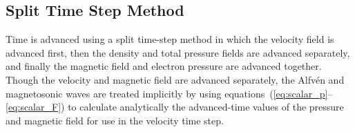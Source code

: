 \documentclass[letterpaper]{book}
\begin{document}
\subsection{Split Time Step Method}



Time is advanced using a split time-step method in which the velocity
field is advanced first, then the density and total pressure fields
are advanced separately, and finally the magnetic field and electron
pressure are advanced together.  Though the velocity and magnetic
field are advanced separately, the Alfv\'en and magnetosonic waves are
treated implicitly by using
equations~(\ref{eq:scalar_p}--\ref{eq:scalar_F}) to calculate
analytically the advanced-time values of the pressure and magnetic
field for use in the velocity time step.
\end{document}
